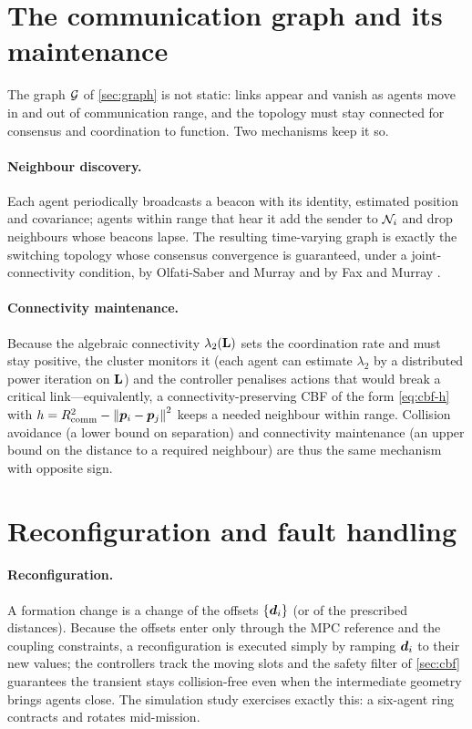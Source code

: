 \section{The communication graph and its maintenance}

The graph $\mathcal{G}$ of \cref{sec:graph} is not static: links appear and vanish as
agents move in and out of communication range, and the topology must stay
connected for consensus and coordination to function. Two mechanisms keep it so.

\paragraph{Neighbour discovery.} Each agent periodically broadcasts a beacon with
its identity, estimated position and covariance; agents within range that hear it
add the sender to $\mathcal{N}_i$ and drop neighbours whose beacons lapse. The
resulting time-varying graph is exactly the switching topology whose consensus
convergence is guaranteed, under a joint-connectivity condition, by
Olfati-Saber and Murray \cite{olfati2004consensus,olfati2007consensus} and by Fax
and Murray \cite{faxmurray2004}.

\paragraph{Connectivity maintenance.} Because the algebraic connectivity
$\lambda_2(\mathbf{L})$ sets the coordination rate and must stay positive, the cluster
monitors it (each agent can estimate $\lambda_2$ by a distributed power
iteration on $\mathbf{L}$) and the controller penalises actions that would break a
critical link---equivalently, a connectivity-preserving CBF of the form
\cref{eq:cbf-h} with $h=R_{\text{comm}}^2-\left\lVert \bm{p}_i-\bm{p}_j \right\rVert^2$ keeps a
needed neighbour within range. Collision avoidance (a lower bound on separation)
and connectivity maintenance (an upper bound on the distance to a required
neighbour) are thus the same mechanism with opposite sign.

\section{Reconfiguration and fault handling}

\paragraph{Reconfiguration.} A formation change is a change of the offsets
$\{\bm{d}_i\}$ (or of the prescribed distances). Because the offsets enter only
through the MPC reference and the coupling constraints, a reconfiguration is
executed simply by ramping $\bm{d}_i$ to their new values; the controllers track
the moving slots and the safety filter of \cref{sec:cbf} guarantees the transient
stays collision-free even when the intermediate geometry brings agents close.
The simulation study exercises exactly this: a six-agent ring contracts and
rotates mid-mission.

